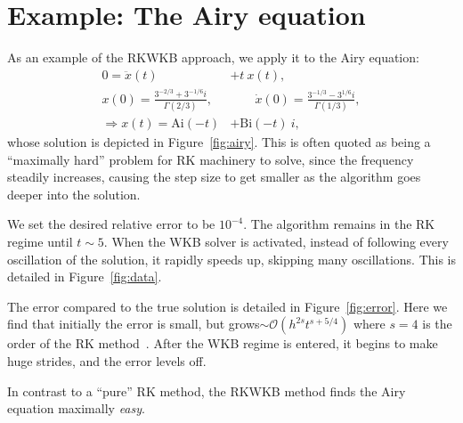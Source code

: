 \section{Example: The Airy equation}


As an example of the RKWKB approach, we apply it to the Airy equation:
\begin{align}
  0=\ddot{x}(t) &+ t\: x(t) ,
  \label{eqn:airy_equation}\\
  x(0)=\frac{3^{-2/3}+3^{-1/6}i}{\Gamma(2/3)},
  &\qquad
  \dot{x}(0) = \frac{3^{-1/3}-3^{1/6}i}{\Gamma(1/3)},
  \nonumber\\
  \Rightarrow x(t) = \mathrm{Ai}(-t) &+ \mathrm{Bi}(-t)\:i,
  \label{eqn:airy_solution}
\end{align}
whose solution is depicted in Figure~\ref{fig:airy}. This is often quoted as being a ``maximally hard'' problem for RK machinery to solve, since the frequency steadily increases, causing the step size to get smaller as the algorithm goes deeper into the solution.

We set the desired relative error to be $10^{-4}$. The algorithm remains in the RK regime until $t\sim5$. When the WKB solver is activated, instead of following every oscillation of the solution, it rapidly speeds up, skipping many oscillations. This is detailed in Figure~\ref{fig:data}.

The error compared to the true solution is detailed in Figure~\ref{fig:error}. Here we find that initially the error is small, but grows$\sim\mathcal{O}(h^{2s} t^{s+5/4})$ where $s=4$ is the order of the RK method~\citep{Iserles02globalerror}. After the WKB regime is entered, it begins to make huge strides, and the error levels off.

In contrast to a ``pure'' RK method, the RKWKB method finds the Airy equation maximally {\em easy}.



